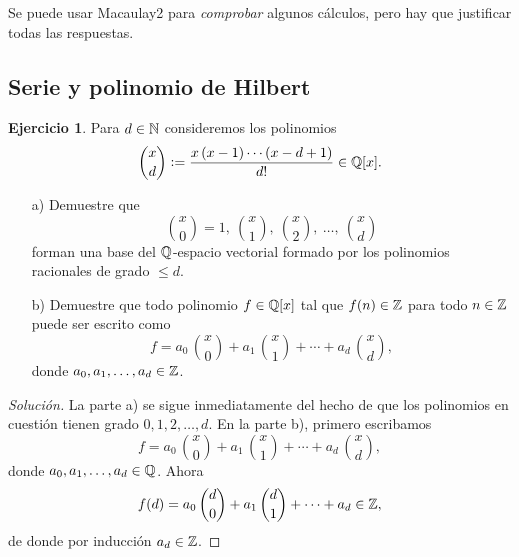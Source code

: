 \documentclass{article}
\theoremstyle{definition}
\newtheorem{ejerc}{Ejercicio}
\newenvironment{solucion}{\begin{proof}[Solución]}{\end{proof}}
\begin{document}

Se puede usar Macaulay2 para \emph{comprobar} algunos cálculos, pero hay que
justificar todas las respuestas.

\subsection*{Serie y polinomio de Hilbert}

\begin{ejerc}
  Para $d \in \mathbb{N}$ consideremos los polinomios
  $${x \choose d} \mathrel{\mathop:}= \frac{x\,(x-1)\cdots (x-d+1)}{d!} \in \mathbb{Q} [x].$$

  \begin{enumerate}
  \item[a)] Demuestre que
    \[ {x \choose 0} = 1, ~
       {x \choose 1}, ~
       {x \choose 2}, ~
       \ldots, ~
       {x\choose d} \]
    forman una base del $\mathbb{Q}$-espacio vectorial formado por los polinomios
    racionales de grado $\le d$.

  \item[b)] Demuestre que todo polinomio $f \in \mathbb{Q} [x]$ tal que $f (n) \in \mathbb{Z}$
    para todo $n\in \mathbb{Z}$ puede ser escrito como
    \[ f = a_0 \, {x \choose 0} + a_1 \, {x \choose 1} + \cdots +
             a_d\,{x \choose d}, \]
    donde $a_0, a_1,\ldots,a_d \in \mathbb{Z}$.
  \end{enumerate}

  \ifdefined\solutions\begin{solucion}
    La parte a) se sigue inmediatamente del hecho de que los polinomios en
    cuestión tienen grado $0,1,2,\ldots,d$. En la parte b), primero escribamos
    \[ f = a_0 \, {x \choose 0} + a_1 \, {x \choose 1} + \cdots +
             a_d\,{x \choose d}, \]
    donde $a_0, a_1,\ldots,a_d \in \mathbb{Q}$. Ahora
    \[ f (d) = a_0 \, {d \choose 0} + a_1 \, {d \choose 1} + \cdots +
                 a_d \in \mathbb{Z}, \]
    de donde por inducción $a_d \in \mathbb{Z}$.
  \end{solucion}\fi
\end{ejerc}
\end{document}
